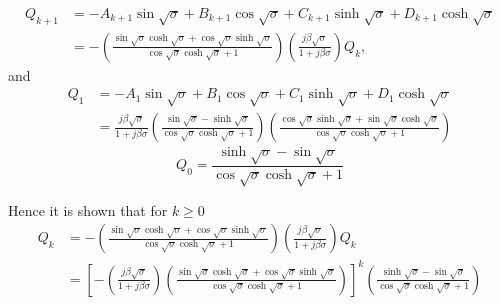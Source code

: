 \documentclass{article}
\begin{document}
\begin{equation}
    \begin{aligned}
        Q_{k+1} &= - A_{k+1} \sin{\sqrt{\sigma}} + B_{k+1} \cos{\sqrt{\sigma}} + C_{k+1} \sinh{\sqrt{\sigma}} + D_{k+1} \cosh{\sqrt{\sigma}} \\
        &= - \left( \frac{ \sin\sqrt{\sigma} \cosh\sqrt{\sigma} + \cos\sqrt{\sigma} \sinh\sqrt{\sigma} }{ \cos\sqrt{\sigma }\cosh\sqrt{\sigma }+1 } \right) \left( \frac{j \beta \sqrt{\sigma }}{1+j \beta \sigma } \right) Q_k,
    \end{aligned}
\end{equation}
and
\begin{equation}
    \begin{aligned}
        Q_{1} &= - A_1 \sin{\sqrt{\sigma}} + B_1 \cos{\sqrt{\sigma}} + C_1 \sinh{\sqrt{\sigma}} + D_1 \cosh{\sqrt{\sigma}} \\
        &= \frac{j \beta  \sqrt{\sigma }}{1+j \beta  \sigma } \left(\frac{\sin\sqrt{\sigma } -\sinh\sqrt{\sigma }}{\cos\sqrt{\sigma } \cosh\sqrt{\sigma }+1} \right)  \left( \frac{\cos\sqrt{\sigma } \sinh\sqrt{\sigma }+\sin\sqrt{\sigma } \cosh\sqrt{\sigma }}{\cos\sqrt{\sigma } \cosh\sqrt{\sigma }+1} \right)
    \end{aligned}
\end{equation}
\begin{equation}
    Q_0 = \frac{\sinh\sqrt{\sigma }-\sin\sqrt{\sigma }}{\cos\sqrt{\sigma } \cosh\sqrt{\sigma }+1}
\end{equation}

Hence it is shown that for $k \geq 0$
\begin{equation}
    \begin{aligned}
        Q_{k} &= - \left( \frac{ \sin\sqrt{\sigma} \cosh\sqrt{\sigma} + \cos\sqrt{\sigma} \sinh\sqrt{\sigma} }{ \cos\sqrt{\sigma }\cosh\sqrt{\sigma }+1 } \right) \left( \frac{j \beta \sqrt{\sigma }}{1+j \beta \sigma } \right) Q_k \\
        &= \left[- \left( \frac{j \beta \sqrt{\sigma }}{1+j \beta \sigma } \right) \left( \frac{ \sin\sqrt{\sigma} \cosh\sqrt{\sigma} + \cos\sqrt{\sigma} \sinh\sqrt{\sigma} }{ \cos\sqrt{\sigma }\cosh\sqrt{\sigma }+1 } \right)  \right]^k \left( \frac{\sinh\sqrt{\sigma }-\sin\sqrt{\sigma }}{\cos\sqrt{\sigma } \cosh\sqrt{\sigma }+1} \right)
    \end{aligned}
\end{equation}
\end{document}
